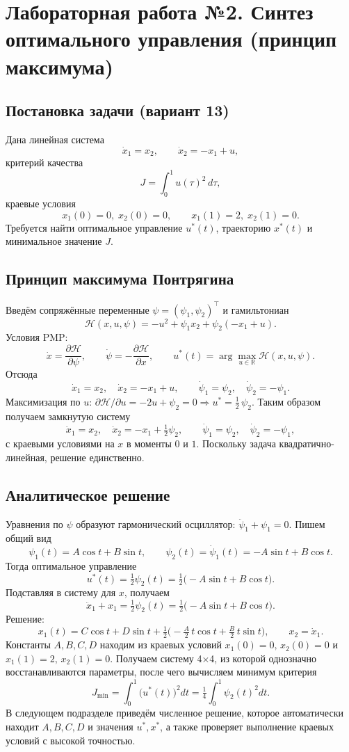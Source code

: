 \chapter{Лабораторная работа №2. Синтез оптимального управления (принцип максимума)}

\section*{Постановка задачи (вариант 13)}
Дана линейная система
\[
\dot x_1 = x_2,\qquad \dot x_2 = -x_1 + u,
\]
критерий качества
\[
J = \int_{0}^{1} u(\tau)^2\,d\tau,
\]
краевые условия
\[
 x_1(0)=0,\; x_2(0)=0,\qquad x_1(1)=2,\; x_2(1)=0.
\]
Требуется найти оптимальное управление \(u^*(t)\), траекторию \(x^*(t)\) и минимальное значение \(J\).

\section{Принцип максимума Понтрягина}
Введём сопряжённые переменные \(\psi=(\psi_1,\psi_2)^\top\) и гамильтониан
\[
\mathcal H(x,u,\psi)= -u^2 + \psi_1 x_2 + \psi_2(-x_1+u).
\]
Условия PMP:
\[
\dot x = \frac{\partial \mathcal H}{\partial \psi},\qquad
\dot \psi = -\frac{\partial \mathcal H}{\partial x},\qquad
u^*(t)=\arg\max_{u\in\mathbb R} \mathcal H(x,u,\psi).
\]
Отсюда
\[
\dot x_1=x_2,\quad \dot x_2=-x_1+u,\qquad
\dot\psi_1=\psi_2,\quad \dot\psi_2=-\psi_1.
\]
Максимизация по \(u\): \(\partial \mathcal H/\partial u=-2u+\psi_2=0\Rightarrow u^*=\tfrac{1}{2}\,\psi_2\).
Таким образом получаем замкнутую систему
\[
\dot x_1=x_2,\quad \dot x_2=-x_1+\tfrac{1}{2}\psi_2,\qquad
\dot\psi_1=\psi_2,\quad \dot\psi_2=-\psi_1,
\]
с краевыми условиями на \(x\) в моменты \(0\) и \(1\). Поскольку задача квадратично-линейная, решение единственно.

\section{Аналитическое решение}
Уравнения по \(\psi\) образуют гармонический осциллятор: \(\ddot\psi_1+\psi_1=0\). Пишем общий вид
\[
\psi_1(t)=A\cos t + B\sin t,\qquad \psi_2(t)=\dot\psi_1(t)=-A\sin t + B\cos t.
\]
Тогда оптимальное управление
\[
 u^*(t)=\tfrac{1}{2}\psi_2(t)=\tfrac{1}{2}\big(-A\sin t + B\cos t\big).
\]
Подставляя в систему для \(x\), получаем
\[
\ddot x_1 + x_1 = \tfrac{1}{2}\psi_2(t) = \tfrac{1}{2}\big(-A\sin t + B\cos t\big).
\]
Решение:
\[
 x_1(t)=C\cos t + D\sin t + \tfrac{1}{2}\Big( -\tfrac{A}{2}\,t\cos t + \tfrac{B}{2}\,t\sin t \Big),\qquad x_2=\dot x_1.
\]
Константы \(A,B,C,D\) находим из краевых условий \(x_1(0)=0,\,x_2(0)=0\) и \(x_1(1)=2,\,x_2(1)=0\). Получаем систему 4×4, из которой однозначно восстанавливаются параметры, после чего вычисляем минимум критерия
\[
 J_{\min}=\int_0^1 \big(u^*(t)\big)^2 dt = \tfrac{1}{4}\int_0^1\psi_2(t)^2 dt.
\]
В следующем подразделе приведём численное решение, которое автоматически находит \(A,B,C,D\) и значения \(u^*,x^*\), а также проверяет выполнение краевых условий с высокой точностью.

